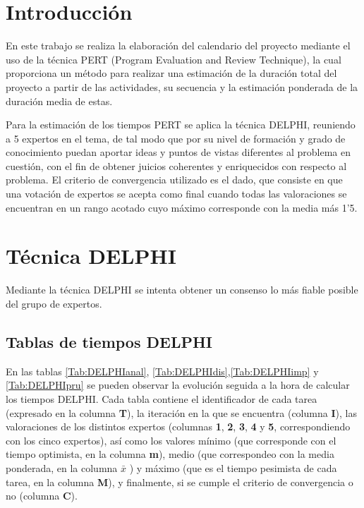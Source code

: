 \documentclass[11pt,a4paper,spanish,twoside]{report}
\begin{document}
\tableofcontents


\chapter*{Introducción}
En este trabajo se realiza la elaboración del calendario del proyecto
mediante el uso de la técnica PERT (Program Evaluation and Review Technique),
la cual proporciona un método para realizar una estimación de la duración
total del proyecto a partir de las actividades, su secuencia y la estimación
ponderada de la duración media de estas. 

Para la estimación de los tiempos PERT se aplica la técnica DELPHI, reuniendo
a 5 expertos en el tema, de tal modo que por su nivel de formación y grado de
conocimiento puedan aportar ideas y puntos de vistas diferentes al problema
en cuestión, con el fin de obtener juicios coherentes y enriquecidos con
respecto al problema. El criterio de convergencia utilizado es el dado, que
consiste en que una votación de expertos se acepta como final cuando todas
las valoraciones se encuentran en un rango acotado cuyo máximo corresponde
con la media más 1'5.

\chapter{Técnica DELPHI}
Mediante la técnica DELPHI se intenta obtener un consenso lo más fiable
posible del grupo de expertos.
    
\section{Tablas de tiempos DELPHI}
En las tablas \ref{Tab:DELPHIanal}, \ref{Tab:DELPHIdis},\ref{Tab:DELPHIimp} y
\ref{Tab:DELPHIpru} se
pueden observar la evolución seguida a la hora de calcular los tiempos
DELPHI. Cada tabla contiene el identificador de cada tarea (expresado en la
columna \textbf{T}), la iteración en
la que se encuentra (columna \textbf{I}), las valoraciones de los distintos
expertos (columnas \textbf{1}, \textbf{2}, \textbf{3}, \textbf{4} y \textbf{5}, correspondiendo con los cinco expertos), así como los
valores mínimo (que corresponde con el tiempo optimista, en la columna \textbf{m}), medio (que
correspondeo con la media ponderada, en la columna \textbf{$\bar{x}$} ) y máximo (que es el tiempo pesimista de
cada tarea, en la columna \textbf{M}), y finalmente, si se cumple el criterio de
convergencia o no (columna \textbf{C}).
\end{document}
